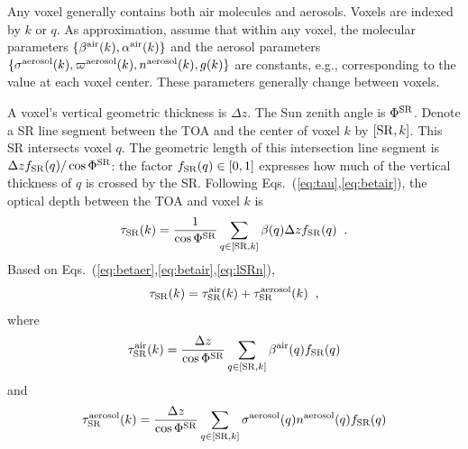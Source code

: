 \documentclass[10pt,twocolumn,letterpaper]{article}
\begin{document}
Any voxel generally contains both air molecules and aerosols. Voxels are indexed by $k$ or $q$. As approximation, assume that within any voxel, the molecular parameters
$\{ \beta^{\rm air}(k),\alpha^{\rm air}(k)\}$ and the aerosol parameters
$\{ \sigma^{\rm aerosol}(k),\varpi^{\rm aerosol}(k), n^{\rm aerosol}(k),g(k)\}$
are constants, e.g., corresponding to the value at each voxel center. These parameters generally change between voxels.

A voxel's vertical geometric thickness is $\Delta z$.  The Sun zenith angle is $\Phi^{\rm SR}$. Denote a SR line segment between the TOA and the center of voxel $k$ by $[{\rm SR},k]$. This SR intersects voxel $q$. The geometric length of this intersection
line segment is $\Delta z f_{\rm SR}(q)/\cos\Phi^{\rm SR}$: the factor
\mbox{$f_{\rm SR}(q)\in [0,1]$} expresses how much of the vertical thickness of $q$ is crossed by the SR. Following Eqs.~(\ref{eq:tau},\ref{eq:betair}), the optical depth between the TOA and voxel $k$ is
\begin{equation}
  \tau_{\rm SR}(k)=\frac{1}{\cos\Phi^{\rm SR}}
     \sum_{q \in[{\rm SR},k]}
     \beta(q)\Delta z  f_{\rm SR}(q)
  \;\;.
  \label{eq:lSRn}
\end{equation}
Based on Eqs.~(\ref{eq:betaer},\ref{eq:betair},\ref{eq:lSRn}),
\begin{equation}
  \tau_{\rm SR}(k)=
   \tau_{\rm SR}^{\rm air}(k) +  \tau_{\rm SR}^{\rm aerosol}(k)
  \;\;,
  \label{eq:lSRaa}
\end{equation}
where
\begin{equation}
  \tau_{\rm SR}^{\rm air}(k)=\frac{\Delta z}{\cos\Phi^{\rm SR}}
     \sum_{q \in[{\rm SR},k]}
     \beta^{\rm air}(q)  f_{\rm SR}(q)
  \label{eq:lSRair}
\end{equation}
and
\begin{equation}
  \tau_{\rm SR}^{\rm aerosol}(k)=\frac{\Delta z}{\cos\Phi^{\rm SR}}
     \sum_{q \in[{\rm SR},k]}
     \sigma^{\rm aerosol}(q) n^{\rm aerosol}(q) f_{\rm SR}(q)
  \label{eq:lSRaeros}
\end{equation}
\end{document}
